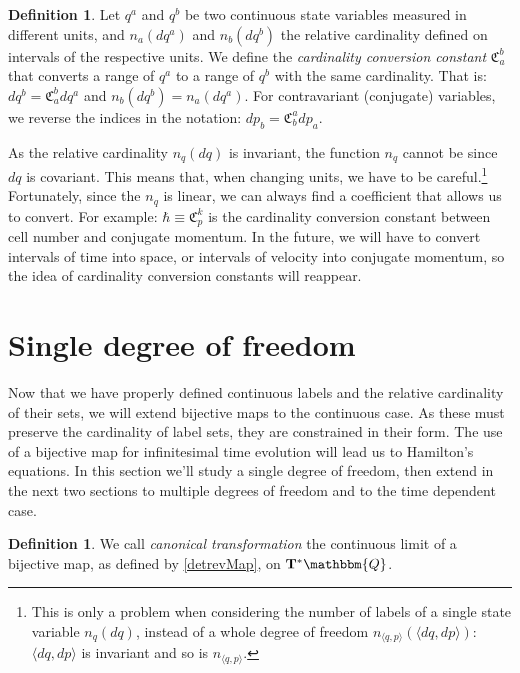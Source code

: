 \documentclass[aps,pra,10pt,twocolumn,floatfix,nofootinbib]{revtex4-1}
\theoremstyle{definition}
\newtheorem{defn}[thm]{Definition}
\begin{document}
\begin{defn}\label{cardinalityConversionConstant}
Let $q^a$ and $q^b$ be two continuous state variables measured in different units, and $n_a(dq^a)$ and $n_b(dq^b)$ the relative cardinality defined on intervals of the respective units. We define the \emph{cardinality conversion constant} $\mathfrak{C}^b_a$ that converts a range of $q^a$ to a range of $q^b$ with the same cardinality. That is: $dq^b = \mathfrak{C}^b_a dq^a$ and $n_b(dq^b)=n_a(dq^a)$. For contravariant (conjugate) variables, we reverse the indices in the notation: $dp_b = \mathfrak{C}^a_b dp_a$.
\end{defn}

As the relative cardinality $n_q(dq)$ is invariant, the function $n_q$ cannot be since $dq$ is covariant. This means that, when changing units, we have to be careful.\footnote{This is only a problem when considering the number of labels of a single state variable $n_q(dq)$, instead of a whole degree of freedom $n_{\langle q, p \rangle}(\langle dq, dp \rangle)$: $\langle dq, dp \rangle$ is invariant and so is $n_{\langle q, p \rangle}$.}
Fortunately, since the $n_q$ is linear, we can always find a coefficient that allows us to convert. For example: $\hbar \equiv \mathfrak{C}^k_p$ is the cardinality conversion constant between cell number and conjugate momentum. In the future, we will have to convert intervals of time into space, or intervals of velocity into conjugate momentum, so the idea of cardinality conversion constants will reappear.

\section{Single degree of freedom}

Now that we have properly defined continuous labels and the relative cardinality of their sets, we will extend bijective maps to the continuous case. As these must preserve the cardinality of label sets, they are constrained in their form. The use of a bijective map for infinitesimal time evolution will lead us to Hamilton's equations. In this section we'll study a single degree of freedom, then extend in the next two sections to multiple degrees of freedom and to the time dependent case.

\begin{defn}\label{canonical}
We call \emph{canonical transformation} the continuous limit of a bijective map, as defined by \ref{detrevMap}, on $\mathbf{T}^*\mathbbm{Q}$.
\end{defn}
\end{document}

